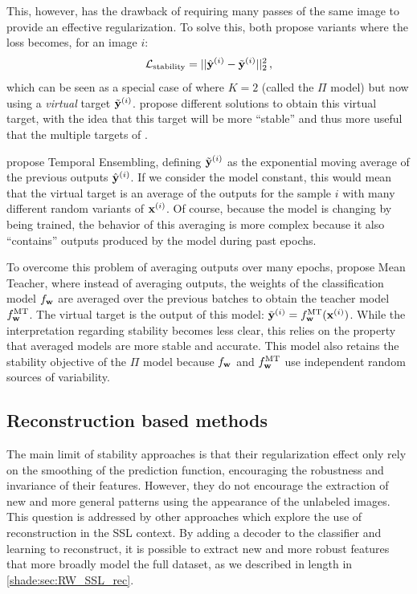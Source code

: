 This, however, has the drawback of requiring many passes of the same image to provide an effective regularization. To solve this, \citet{Laine2016,Tarvainen2017} both propose variants where the loss becomes, for an image $i$:
\begin{equation}
  \mathcal{L}_\mathrm{stability} = ||\hat{\mathbf{y}}^{(i)} - \tilde{\mathbf{y}}^{(i)}||_2^2\,,
\end{equation}
which can be seen as a special case of \citet{Sajjadi2016} where $K=2$ (called the $\Pi$ model) but now using a \textit{virtual} target $\tilde{\mathbf{y}}^{(i)}$. \citet{Laine2016,Tarvainen2017} propose different solutions to obtain this virtual target, with the idea that this target will be more ``stable'' and thus more useful that the multiple targets of \citet{Sajjadi2016}.

\citet{Laine2016} propose Temporal Ensembling, defining $\tilde{\mathbf{y}}^{(i)}$ as the exponential moving average of the previous outputs $\hat{\mathbf{y}}^{(i)}$. If we consider the model constant, this would mean that the virtual target is an average of the outputs for the sample $i$ with many different random variants of $\mathbf{x}^{(i)}$. Of course, because the model is changing by being trained, the behavior of this averaging is more complex because it also ``contains'' outputs produced by the model during past epochs.

To overcome this problem of averaging outputs over many epochs, \citet{Tarvainen2017} propose Mean Teacher, where instead of averaging outputs, the weights of the classification model $f_{\mathbf{w}}$ are averaged over the previous batches to obtain the teacher model $f^\mathrm{MT}_{\mathbf{w}}$. The virtual target is the output of this model: $\tilde{\mathbf{y}}^{(i)} =  f^\mathrm{MT}_{\mathbf{w}}(\mathbf{x}^{(i)})$.
While the interpretation regarding stability becomes less clear, this relies on the property that averaged models are more stable and accurate. This model also retains the stability objective of the $\Pi$ model because $f_{\mathbf{w}}$ and $f^\mathrm{MT}_{\mathbf{w}}$ use independent random sources of variability.


\subsection{Reconstruction based methods}

The main limit of stability approaches is that their regularization effect only rely on the smoothing of the prediction function, encouraging the robustness and invariance of their features. However, they do not encourage the extraction of new and more general patterns using the appearance of the unlabeled images. This question is addressed by other approaches which explore the use of reconstruction in the \ac{SSL} context. By adding a decoder to the classifier and learning to reconstruct, it is possible to extract new and more robust features that more broadly model the full dataset, as we described in length in \autoref{shade:sec:RW_SSL_rec}.

